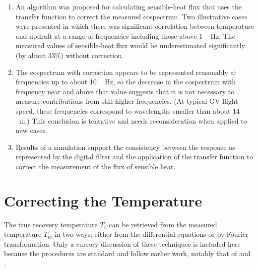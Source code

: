 \documentclass[amt, manuscript]{copernicus}
\begin{document}
\begin{enumerate}
to significant improvement in those measurements.
\item An algorithm was proposed for calculating sensible-heat flux that uses the transfer
function to correct the measured cospectrum.
Two illustrative cases were presented in which there was significant
correlation between temperature and updraft at a range of frequencies
including those above \unit{1\,Hz}. The measured values of sensible-heat
flux would be underestimated significantly (by about 33\%) without
correction.
\item The cospectrum with correction appears to be represented reasonably
at frequencies up to about \unit{10\,Hz}, so the decrease in the cospectrum
with frequency near and above that value suggests that it is not necessary to
measure contributions from still higher frequencies. (At typical GV flight
speed, these frequencies correspond to
wavelengths smaller than about \unit{14\,m}.)  This conclusion
is tentative and needs reconsideration when applied to new cases.
\item Results of a simulation support the consistency between the response
as represented by the digital filter and the application of the transfer
function to correct the measurement of the flux of sensible heat.
\end{enumerate}
\newpage
\appendix

\section{\texorpdfstring{Correcting the Temperature
\label{sec:Correcting-the-Temperature}}{Correcting the Temperature }}

The true recovery temperature \(T_{r}\) can be retrieved from the
measured temperature \(T_{m}\) in two ways, either from the differential
equations or by Fourier transformation. Only a cursory discussion of
these techniques is included here because the procedures are standard
and follow earlier work, notably that of \citet{InverarityJTech2000} and
\citet{Foster2012Improving}.
\end{document}
